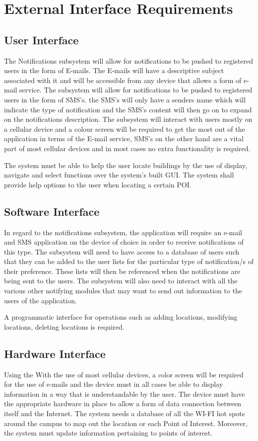 \documentclass{article}
\begin{document}
\section{External Interface Requirements}
\subsection{User Interface}


The Notifications subsystem will allow for notifications to be pushed to registered users in the form of E-mails. The E-mails will have a descriptive subject associated with it and will be accessible from any device that allows a form of e-mail service.
The subsystem will allow for notifications to be pushed to registered users in the form of SMS's. the SMS's will only have a senders name which will indicate the type of notification and the SMS's content will then go on to expand on the notifications description.
The subsystem will interact with users mostly on a cellular device and a colour screen will be required to get the most out of the application in terms of the E-mail service, SMS's on the other hand are a vital part of most cellular devices and in most cases no extra functionality is required.



The system must be able to help the user locate buildings by the use of display, navigate and select functions over the system's built GUI.
The system shall provide help options to the user when locating a certain POI.

\subsection{Software Interface}

In regard to the notifications subsystem, the application will require an e-mail and SMS application on the device of choice in order to receive notifications of this type.
The subsystem will need to have access to a database of users such that they can be added to the user lists for the particular type of notification/s of their preference. These lists will then be referenced when the notifications are being sent to the users. The subsystem will also need to interact with all the various other notifying modules that may want to send out information to the users of the application.

A programmatic interface for operations such as adding locations, modifying locations, deleting locations is required.
\subsection{Hardware Interface}
Using the With the use of most cellular devices, a color screen will be required for the use of e-mails and the device must in all cases be able to display information in a way that is understandable by the user.
The device must have the appropriate hardware in place to allow a form of data connection between itself and the Internet.
The system needs a database of all the WI-FI hot spots around the campus to map out the location or each Point of Interest. Moreover, the system must update information pertaining to points of interest.
\end{document}
